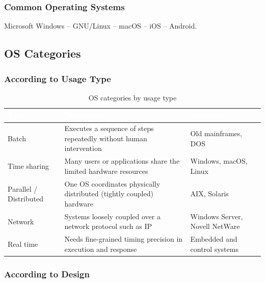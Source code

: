 \subsubsection{Common Operating Systems}
Microsoft Windows -- GNU/Linux -- macOS -- iOS -- Android.

\subsection{OS Categories}
\subsubsection{According to Usage Type}

\begin{table}[h!]
	\centering
	\renewcommand{\arraystretch}{1.4}
	\begin{tabularx}{\textwidth}{|>{\raggedright\arraybackslash}p{3cm}|>{\raggedright\arraybackslash}X|>{\raggedright\arraybackslash}p{4cm}|}
		\hline
		\rowcolor{TableCyan}
		\textcolor{white}{\textbf{Type}} & \textcolor{white}{\textbf{Description}} & \textcolor{white}{\textbf{Examples}} \\ \hline
		\rowcolor{TableLightBlue}
		Batch & Executes a sequence of steps repeatedly without human intervention & Old mainframes, DOS \\ \hline
		\rowcolor{TableLightBlue}
		Time sharing & Many users or applications share the limited hardware resources & Windows, macOS, Linux \\ \hline
		\rowcolor{TableLightBlue}
		Parallel / Distributed & One OS coordinates physically distributed (tightly coupled) hardware & AIX, Solaris \\ \hline
		\rowcolor{TableLightBlue}
		Network & Systems loosely coupled over a network protocol such as IP & Windows Server, Novell NetWare \\ \hline
		\rowcolor{TableLightBlue}
		Real time & Needs fine-grained timing precision in execution and response & Embedded and control systems \\ \hline
	\end{tabularx}
	\caption{OS categories by usage type}
\end{table}

\subsubsection{According to Design}

